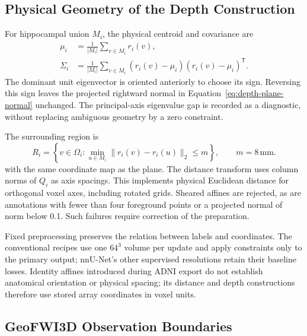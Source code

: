 \documentclass[12pt,a4paper]{article}
\begin{document}
\subsection{Physical Geometry of the Depth Construction}

For hippocampal union $M_i$, the physical centroid and covariance are
\begin{equation}
\begin{aligned}
\mu_i&=\frac{1}{|M_i|}\sum_{v\in M_i}r_i(v),\\
\Sigma_i&=\frac{1}{|M_i|}\sum_{v\in M_i}
       (r_i(v)-\mu_i)(r_i(v)-\mu_i)^{\mathsf T}.
\end{aligned}
\label{eq:depth-centroid-covariance}
\end{equation}
The dominant unit eigenvector is oriented anteriorly to choose its
sign. Reversing this sign leaves the projected rightward normal in
Equation~\ref{eq:depth-plane-normal} unchanged. The principal-axis
eigenvalue gap is recorded as a diagnostic, without replacing
ambiguous geometry by a zero constraint.

The surrounding region is
\begin{equation}
R_i=\left\{v\in\Omega_i:
       \min_{u\in M_i}\|r_i(v)-r_i(u)\|_2\leq m\right\},
\qquad m=8\,\mathrm{mm}.
\label{eq:depth-region-of-interest}
\end{equation}
with the same coordinate map as the plane. The distance transform uses
column norms of $Q_i$ as axis spacings. This implements physical
Euclidean distance for orthogonal voxel axes, including rotated grids.
Sheared affines are rejected, as are annotations with fewer than four
foreground points or a projected normal of norm below 0.1. Such
failures require correction of the preparation.

Fixed preprocessing preserves the relation between labels and
coordinates. The conventional recipes use one $64^3$ volume per update
and apply constraints only to the primary output; nnU-Net's other
supervised resolutions retain their baseline losses. Identity affines
introduced during ADNI export do not establish anatomical orientation
or physical spacing; its distance and depth constructions therefore
use stored array coordinates in voxel units.

\subsection{GeoFWI3D Observation Boundaries}
\label{sec:geo-boundaries}
\end{document}
